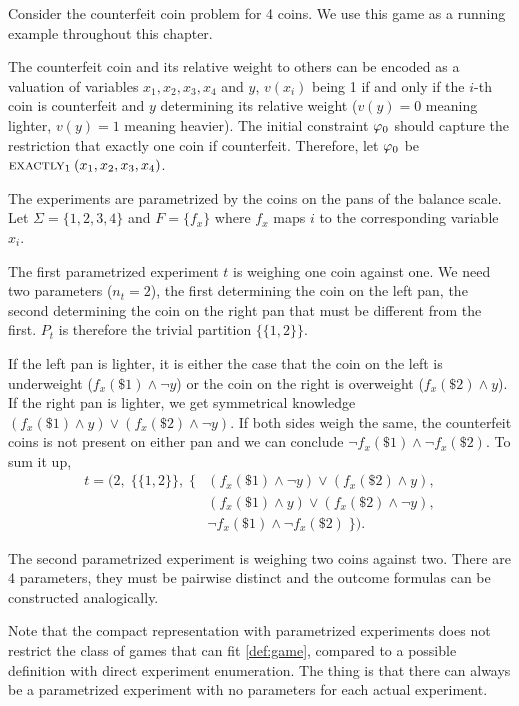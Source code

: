 \begin{example} \label{ex:run1}
Consider the counterfeit coin problem for 4 coins.
We use this game as a running example throughout this chapter.

The counterfeit coin and its relative weight to others can be encoded
  as a valuation of variables $x_1, x_2, x_3, x_4$ and $y$,
  $v(x_i)$ being 1 if and only if the $i$-th coin is counterfeit and
  $y$ determining its relative weight
  ($v(y) = 0$ meaning lighter, $v(y) = 1$ meaning heavier).
The initial constraint $\varphi_0$ should capture the restriction that exactly one
  coin if counterfeit.
Therefore, let $\varphi_0$ be $\textsc{exactly}_{1}\:(x_1, x_2, x_3, x_4)$.

The experiments are parametrized by the coins on the pans of the balance scale.
Let $\Sigma = \{1, 2, 3, 4\}$ and $F = \{ f_x \}$ where $f_x$
maps $i$ to the corresponding variable $x_i$.

The first parametrized experiment $t$ is weighing one coin against one.
We need two parameters ($n_t = 2$),
  the first determining the coin on the left pan,
  the second determining the coin on the right pan that must be different
  from the first.
$P_t$ is therefore the trivial partition $\{\{1, 2\}\}$.

If the left pan is lighter, it is either the case that the
  coin on the left is underweight ($f_x(\$1) \wedge \neg y$)
  or the coin on the right is overweight ($f_x(\$2) \wedge y$).
If the right pan is lighter, we get symmetrical knowledge
  $(f_x(\$1)\wedge y) \vee (f_x(\$2)\wedge\neg y)$.
If both sides weigh the same, the counterfeit coins is not present on either pan
  and we can conclude $\neg f_x(\$1) \wedge \neg f_x(\$2)$.
To sum it up,
\begin{align*}
  t = \big(2,\; \big\{\{1,2\}\big\},\; \big\{ &
    (f_x(\$1)\wedge \neg y) \vee (f_x(\$2)\wedge y), \\
    & (f_x(\$1)\wedge y) \vee (f_x(\$2)\wedge\neg y), \\
    & \neg f_x(\$1) \wedge \neg f_x(\$2) \;\big\}\big).
\end{align*}

The second parametrized experiment is weighing two coins against two.
There are $4$ parameters, they must be pairwise distinct and the outcome
  formulas can be constructed analogically. \eqed
\end{example}


Note that the compact representation with parametrized experiments
  does not restrict the class of games that can fit \autoref{def:game},
  compared to a possible definition with direct experiment enumeration.
The thing is that there can always be a parametrized experiment
  with no parameters for each actual experiment.

